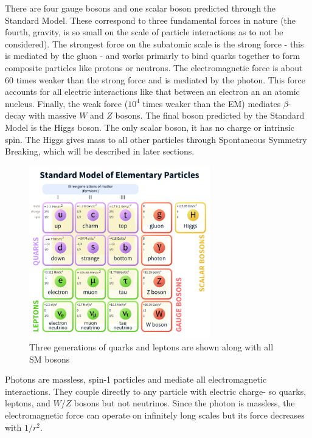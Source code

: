 There are four gauge bosons and one scalar boson predicted through the Standard Model. These correspond to three fundamental forces in nature (the fourth, gravity, is so small on the scale of particle interactions as to not be considered). The strongest force on the subatomic scale is the strong force - this is mediated by the gluon - and works primarly to bind quarks together to form composite particles like protons or neutrons. The electromagnetic force is about $60$ times weaker than the strong force and is mediated by the photon. This force accounts for all electric interactions like that between an electron an an atomic nucleus. Finally, the weak force ($10^4$ times weaker than the EM) mediates $\beta$-decay with massive $W$ and $Z$ bosons. The final boson predicted by the Standard Model is the Higgs boson. The only scalar boson, it has no charge or intrinsic spin. The Higgs gives mass to all other particles through Spontaneous Symmetry Breaking, which will be described in later sections.
\begin{figure}[H]
	\centering
    \includegraphics[width=0.7\textwidth] {Pictures/SMparticles.png}\hspace{1cm}
    \caption{Three generations of quarks and leptons are shown along with all SM bosons \cite{PDG}}
    \label{fig:SMparticles}
\end{figure}
Photons are massless, spin-1 particles and mediate all electromagnetic interactions. They couple directly to any particle with electric charge- so quarks, leptons, and $W$/$Z$ bosons but not neutrinos. Since the photon is massless, the electromagnetic force can operate on infinitely long scales but its force decreases with $1/r^2$.
 
